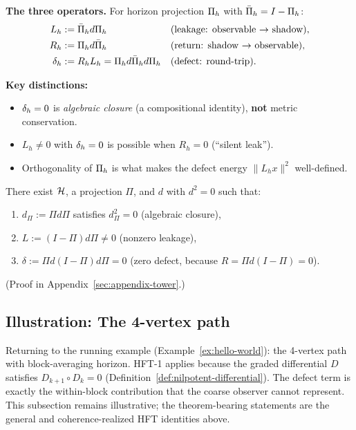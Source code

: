 \begin{tcolorbox}[colback=yellow!5, colframe=black!70, title={Warning: Zero defect $\neq$ conservation}]
\label{box:zero-defect-warning}
\textbf{The three operators.} For horizon projection $\CCPi{h}$ with $\CCPibar{h} = I - \CCPi{h}$:
\begin{align*}
L_h &:= \CCPibar{h} d \CCPi{h} &&\text{(leakage: observable $\to$ shadow)}, \\
R_h &:= \CCPi{h} d \CCPibar{h} &&\text{(return: shadow $\to$ observable)}, \\
\CCDefect{d}{h} &:= R_h L_h = \CCPi{h} d \CCPibar{h} d \CCPi{h} &&\text{(defect: round-trip)}.
\end{align*}

\textbf{Key distinctions:}
\begin{itemize}[itemsep=0.2em]
\item $\CCDefect{d}{h} = 0$ is \emph{algebraic closure} (a compositional identity), \textbf{not} metric conservation.
\item $L_h \neq 0$ with $\CCDefect{d}{h} = 0$ is possible when $R_h = 0$ (``silent leak'').
\item Orthogonality of $\CCPi{h}$ is what makes the defect energy $\|L_h x\|^2$ well-defined.
\end{itemize}
\end{tcolorbox}

\begin{lemma}
\label{lem:silent-leak}
There exist $\cH$, a projection $\Pi$, and $d$ with $d^2 = 0$ such that:
\begin{enumerate}[label=(\roman*),itemsep=0.1em]
\item $d_\Pi := \Pi d \Pi$ satisfies $d_\Pi^2 = 0$ (algebraic closure),
\item $L := (I - \Pi) d \Pi \neq 0$ (nonzero leakage),
\item $\delta := \Pi d (I - \Pi) d \Pi = 0$ (zero defect, because $R = \Pi d (I-\Pi) = 0$).
\end{enumerate}
\end{lemma}

(Proof in Appendix~\ref{sec:appendix-tower}.)

\subsection{Illustration: The 4-vertex path}

Returning to the running example (Example~\ref{ex:hello-world}): the
4-vertex path with block-averaging horizon. HFT-1 applies because the graded
differential $D$ satisfies $D_{k+1} \circ D_k = 0$
(Definition~\ref{def:nilpotent-differential}). The defect term is exactly the
within-block contribution that the coarse observer cannot represent. This
subsection remains illustrative; the theorem-bearing statements are the general
and coherence-realized HFT identities above.

